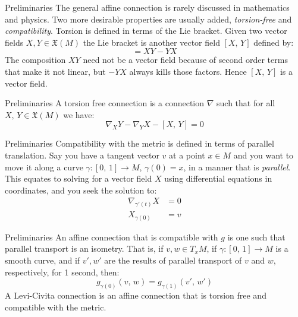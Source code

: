 \documentclass{beamer}
\begin{document}
    \begin{frame}{Preliminaries}
        The general affine connection is rarely discussed in mathematics and
        physics. Two more desirable properties are usually added,
        \textit{torsion-free} and \textit{compatibility}. Torsion is defined
        in terms of the Lie bracket. Given two vector fields
        $X,Y\in\mathfrak{X}(M)$ the Lie bracket is another vector field
        $[X,\,Y]$ defined by:
        \begin{equation}
            [X,\,Y]=XY-YX
        \end{equation}
        The composition $XY$ need not be a vector field because of second order
        terms that make it not linear, but $-YX$ always kills those factors.
        Hence $[X,\,Y]$ is a vector field.
    \end{frame}
    \begin{frame}{Preliminaries}
        A torsion free connection is a connection $\nabla$ such that for all
        $X,\,Y\in\mathfrak{X}(M)$ we have:
        \begin{equation}
            \nabla_{X}Y-\nabla_{Y}X-[X,\,Y]=0
        \end{equation}
    \end{frame}
    \begin{frame}{Preliminaries}
        Compatibility with the metric is defined in terms of parallel
        translation. Say you have a tangent vector $v$ at a point
        $x\in{M}$ and you want to move it along a curve
        $\gamma:[0,\,1]\rightarrow{M}$, $\gamma(0)=x$, in a manner that is
        \textit{parallel}. This equates to solving for a vector field $X$
        using differential equations in coordinates, and you seek
        the solution to:
        \begin{align}
            \nabla_{\gamma'(t)}X&=0\\
            X_{\gamma(0)}&=v
        \end{align}
    \end{frame}
    \begin{frame}{Preliminaries}
        An affine connection that is compatible with $g$ is one such that
        parallel transport is an isometry. That is, if $v,w\in{T}_{x}M$, if
        $\gamma:[0,\,1]\rightarrow{M}$ is a smooth curve, and if
        $v',w'$ are the results of parallel transport of $v$ and $w$,
        respectively, for 1 second, then:
        \begin{equation}
            g_{\gamma(0)}(v,\,w)
            =g_{\gamma(1)}(v',\,w')
        \end{equation}
        A Levi-Civita connection is an affine connection that is torsion free
        and compatible with the metric.
    \end{frame}
\end{document}
